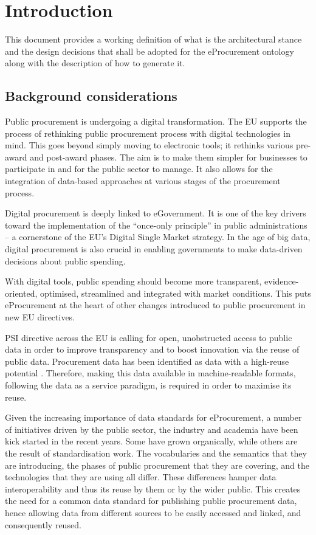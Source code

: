 \section{Introduction}
\label{sec:introduction}

 	This document provides a working definition of what is the architectural stance and the design decisions that shall be adopted for the eProcurement ontology along with the description of how to generate it. 
	
	\subsection{Background considerations}
	
	Public procurement is undergoing a digital transformation. The EU supports the process of rethinking public procurement process with digital technologies in mind. This goes beyond simply moving to electronic tools; it rethinks various pre-award and post-award phases. The aim is to make them simpler for businesses to participate in and for the public sector to manage. It also allows for the integration of data-based approaches at various stages of the procurement process.
	
	Digital procurement is deeply linked to eGovernment. It is one of the key drivers toward the implementation of the ``once-only principle'' in public administrations -- a cornerstone of the EU's Digital Single Market strategy. In the age of big data, digital procurement is also crucial in enabling governments to make data-driven decisions about public spending.
	
	With digital tools, public spending should become more transparent, evidence-oriented, optimised, streamlined and integrated with market conditions. This puts eProcurement at the heart of other changes introduced to public procurement in new EU directives.
	
	PSI directive \cite{directive-2013/37/EU} across the EU is calling for open, unobstructed access to public data in order to improve transparency and to boost innovation via the reuse of public data. Procurement data has been identified as data with a high-reuse potential \cite{d-high-value-assets}. Therefore, making this data available in machine-readable formats, following the data as a service paradigm, is required in order to maximise its reuse.
	
	Given the increasing importance of data standards for eProcurement, a number of initiatives driven by the public sector, the industry and academia have been kick started	in the recent years. Some have grown organically, while others are the result of	standardisation work. The vocabularies and the semantics that they are introducing, the 
	phases of public procurement that they are covering, and the technologies that they are using all differ. These differences hamper data interoperability and thus its reuse by them or by the wider public. This creates the need for a common data standard for
publishing public procurement data, hence allowing data from different sources to be 
	easily accessed and linked, and consequently reused. 
	

